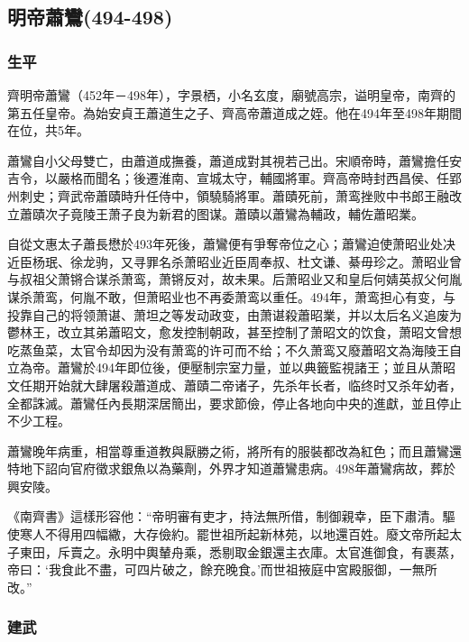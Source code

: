 
\subsection{明帝蕭鸞\tiny(494-498)}

\subsubsection{生平}

齊明帝蕭鸞（452年－498年），字景栖，小名玄度，廟號高宗，谥明皇帝，南齊的第五任皇帝。為始安貞王蕭道生之子、齊高帝蕭道成之姪。他在494年至498年期間在位，共5年。

蕭鸞自小父母雙亡，由蕭道成撫養，蕭道成對其視若己出。宋順帝時，蕭鸞擔任安吉令，以嚴格而聞名；後遷淮南、宣城太守，輔國將軍。齊高帝時封西昌侯、任郢州刺史；齊武帝蕭賾時升任侍中，領驍騎將軍。蕭賾死前，萧鸾挫败中书郎王融改立蕭賾次子竟陵王萧子良为新君的图谋。蕭賾以蕭鸞為輔政，輔佐蕭昭業。

自從文惠太子蕭長懋於493年死後，蕭鸞便有爭奪帝位之心；蕭鸞迫使萧昭业处决近臣杨珉、徐龙驹，又寻罪名杀萧昭业近臣周奉叔、杜文谦、綦毋珍之。萧昭业曾与叔祖父萧锵合谋杀萧鸾，萧锵反对，故未果。后萧昭业又和皇后何婧英叔父何胤谋杀萧鸾，何胤不敢，但萧昭业也不再委萧鸾以重任。494年，萧鸾担心有变，与投靠自己的将领萧谌、萧坦之等发动政变，由萧谌殺蕭昭業，并以太后名义追废为鬱林王，改立其弟蕭昭文，愈发控制朝政，甚至控制了萧昭文的饮食，萧昭文曾想吃蒸鱼菜，太官令却因为没有萧鸾的许可而不给；不久萧鸾又廢蕭昭文為海陵王自立為帝。蕭鸞於494年即位後，便壓制宗室力量，並以典籤監視諸王；並且从萧昭文任期开始就大肆屠殺蕭道成、蕭賾二帝诸子，先杀年长者，临终时又杀年幼者，全都誅滅。蕭鸞任內長期深居簡出，要求節儉，停止各地向中央的進獻，並且停止不少工程。

蕭鸞晚年病重，相當尊重道教與厭勝之術，將所有的服裝都改為紅色；而且蕭鸞還特地下詔向官府徵求銀魚以為藥劑，外界才知道蕭鸞患病。498年蕭鸞病故，葬於興安陵。

《南齊書》這樣形容他：“帝明審有吏才，持法無所借，制御親幸，臣下肅清。驅使寒人不得用四幅繖，大存儉約。罷世祖所起新林苑，以地還百姓。廢文帝所起太子東田，斥賣之。永明中輿輦舟乘，悉剔取金銀還主衣庫。太官進御食，有裹蒸，帝曰：‘我食此不盡，可四片破之，餘充晚食。’而世祖掖庭中宮殿服御，一無所改。”

\subsubsection{建武}

